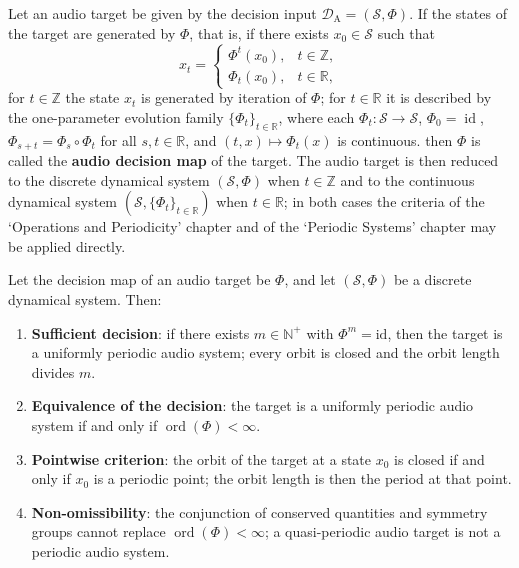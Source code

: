 \begin{definition}\label{def:audio_periodization}
Let an audio target be given by the decision input $\mathcal D_{\mathrm{A}}=(\mathcal S,\Phi)$. If the states of the target are generated by $\Phi$, that is, if there exists $x_0\in\mathcal S$ such that
\[
x_t=\begin{cases}\Phi^t(x_0), & t\in\mathbb Z,\\ \Phi_t(x_0), & t\in\mathbb R,\end{cases}
\]
for $t\in\mathbb Z$ the state $x_t$ is generated by iteration of $\Phi$; for $t\in\mathbb R$ it is described by the one-parameter evolution family $\{\Phi_t\}_{t\in\mathbb R}$, where each $\Phi_t:\mathcal S\to\mathcal S$, $\Phi_0=\operatorname{id}$, $\Phi_{s+t}=\Phi_s\circ\Phi_t$ for all $s,t\in\mathbb R$, and $(t,x)\mapsto\Phi_t(x)$ is continuous.
then $\Phi$ is called the \textbf{audio decision map} of the target. The audio target is then reduced to the discrete dynamical system $(\mathcal S,\Phi)$ when $t\in\mathbb Z$ and to the continuous dynamical system $(\mathcal S,\{\Phi_t\}_{t\in\mathbb R})$ when $t\in\mathbb R$; in both cases the criteria of the `Operations and Periodicity' chapter and of the `Periodic Systems' chapter may be applied directly.
\end{definition}

\begin{theorem}\label{thm:audio_periodicity_decision}
Let the decision map of an audio target be $\Phi$, and let $(\mathcal S,\Phi)$ be a discrete dynamical system. Then:
\begin{enumerate}[label=(\Alph*)]
    \item \textbf{Sufficient decision}: if there exists $m\in\mathbb N^+$ with $\Phi^m=\mathrm{id}$, then the target is a uniformly periodic audio system; every orbit is closed and the orbit length divides $m$.
    \item \textbf{Equivalence of the decision}: the target is a uniformly periodic audio system if and only if $\operatorname{ord}(\Phi)<\infty$.
    \item \textbf{Pointwise criterion}: the orbit of the target at a state $x_0$ is closed if and only if $x_0$ is a periodic point; the orbit length is then the period at that point.
    \item \textbf{Non-omissibility}: the conjunction of conserved quantities and symmetry groups cannot replace $\operatorname{ord}(\Phi)<\infty$; a quasi-periodic audio target is not a periodic audio system.
\end{enumerate}
\end{theorem}


